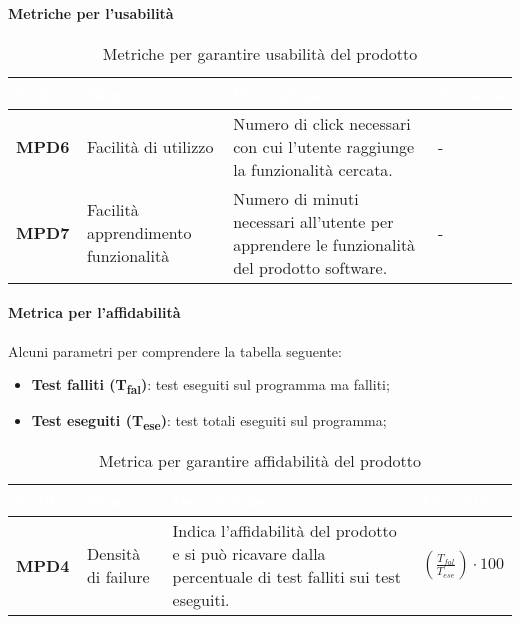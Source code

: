 \paragraph{Metriche per l'usabilità}
\renewcommand{\arraystretch}{1.5}
\renewcommand\extrarowheight{1.5pt}
\begin{longtable}{C{1.5cm} C{4.5cm} C{5.5cm} C{5cm}}
		\textcolor{white}{\textbf{Codice}} & 
		\textcolor{white}{\textbf{Nome}} & 
		\textcolor{white}{\textbf{Descrizione}} & 
		\textcolor{white}{\textbf{Formula}} \\
		\endfirsthead
	    \endfoot
	    \caption{Metriche per garantire usabilità del prodotto}
	    \endlastfoot
		\hline
		\textbf{MPD6} & 
		Facilità di utilizzo & 
		Numero di click necessari con cui l'utente raggiunge la funzionalità cercata. &
		- \\
		\textbf{MPD7} & 
		Facilità apprendimento funzionalità & 
		Numero di minuti necessari all'utente per apprendere le funzionalità del prodotto software. & - \\
\end{longtable}
\paragraph{Metrica per l'affidabilità}
Alcuni parametri per comprendere la tabella seguente:
\begin{itemize}
\item \textbf{Test falliti (T\textsubscript{fal})}: test eseguiti sul programma ma falliti;
	\item \textbf{Test eseguiti (T\textsubscript{ese})}: test totali eseguiti sul programma;
\end{itemize}
\renewcommand{\arraystretch}{1.5}
\renewcommand\extrarowheight{1.5pt}
\begin{longtable}{C{1.5cm} C{4.5cm} C{5.5cm} C{5cm}}
		\textcolor{white}{\textbf{Codice}} & 
		\textcolor{white}{\textbf{Nome}} & 
		\textcolor{white}{\textbf{Descrizione}} & 
		\textcolor{white}{\textbf{Formula}} \\
		\endfirsthead
	    \endfoot
	    \caption{Metrica per garantire affidabilità del prodotto}
	    \endlastfoot
		\hline
		\textbf{MPD4} & 
		Densità di failure & 
		Indica l'affidabilità del prodotto e si può ricavare dalla percentuale di test falliti sui test eseguiti. &
		$(\frac{T_{fal}}{T_{ese}}) \cdot 100 $ \\
\end{longtable}		